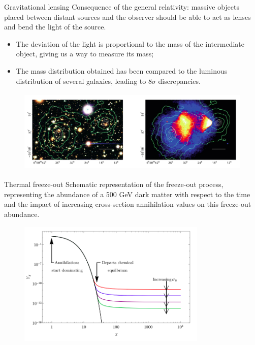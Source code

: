 \documentclass[8pt]{beamer}
\begin{document}
\begin{frame}{Gravitational lensing}
\justifying
\vspace{5pt}
Consequence of the general relativity: massive objects placed between distant sources and the observer should be able to act as lenses and bend the light of the source. \vfill

\begin{itemize}
\justifying
\item The deviation of the light is proportional to the mass of the intermediate object, giving us a way to measure its mass;
\item The mass distribution obtained has been compared to the luminous distribution of several galaxies, leading to $8\sigma$ discrepancies. %
\end{itemize} \vfill

\vspace{-5pt}
\begin{figure}[htbp]
\begin{center}
\includegraphics[width=11	cm, height=4cm]{figs/BulletCluster.png}
\end{center}
\end{figure} \vfill
\end{frame}

\begin{frame}{Thermal freeze-out}
\justifying
\vspace{5pt}
Schematic representation of the freeze-out process, representing the abundance of a
500 GeV dark matter with respect to the time and the impact of increasing cross-section annihilation
values on this freeze-out abundance. \vfill

\begin{figure}[htbp]
\begin{center}
\includegraphics[width=9cm, height=6cm]{figs/FreezeOut.png}
\end{center}
\end{figure} \vfill
\end{frame}
\end{document}
